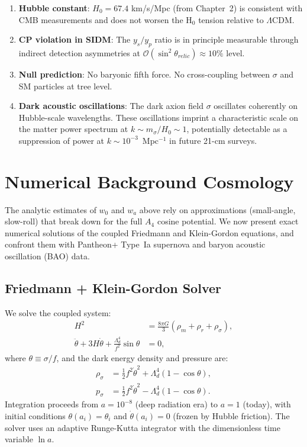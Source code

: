 \begin{enumerate}
  \item \textbf{Hubble constant}: $H_0 = 67.4$ km/s/Mpc (from Chapter~2)
        is consistent with CMB measurements and does not worsen the H$_0$ tension
        relative to $\Lambda$CDM.

  \item \textbf{CP violation in SIDM}: The $y_s/y_p$ ratio is in principle
        measurable through indirect detection asymmetries at
        $\mathcal{O}(\sin^2\theta_{relic}) \approx 10\%$ level.

  \item \textbf{Null prediction}: No baryonic fifth force.
        No cross-coupling between $\sigma$ and SM particles at tree level.

  \item \textbf{Dark acoustic oscillations}: The dark axion field $\sigma$
        oscillates coherently on Hubble-scale wavelengths. These oscillations
        imprint a characteristic scale on the matter power spectrum at
        $k \sim m_\sigma/H_0 \sim 1$, potentially detectable as a suppression
        of power at $k \sim 10^{-3}$~Mpc$^{-1}$ in future 21-cm surveys.
\end{enumerate}

\section{Numerical Background Cosmology}
\label{ch3:numerical_cosmology}

The analytic estimates of $w_0$ and $w_a$ above rely on approximations
(small-angle, slow-roll) that break down for the full $A_4$ cosine potential.
We now present exact numerical solutions of the coupled Friedmann and
Klein-Gordon equations, and confront them with Pantheon+ Type~Ia supernova
and baryon acoustic oscillation (BAO) data.

\subsection{Friedmann + Klein-Gordon Solver}
\label{ch3:friedmann_kg}

We solve the coupled system:
\begin{align}
  H^2 &= \frac{8\pi G}{3}\left(\rho_m + \rho_r + \rho_\sigma\right), \\
  \ddot{\theta} + 3H\dot{\theta} + \frac{\Lambda_d^4}{f^2}\sin\theta &= 0,
\end{align}
where $\theta \equiv \sigma/f$, and the dark energy density and pressure are:
\begin{align}
  \rho_\sigma &= \tfrac{1}{2}f^2\dot{\theta}^2 + \Lambda_d^4(1 - \cos\theta), \\
  p_\sigma &= \tfrac{1}{2}f^2\dot{\theta}^2 - \Lambda_d^4(1 - \cos\theta).
\end{align}
Integration proceeds from $a = 10^{-8}$ (deep radiation era) to $a = 1$ (today),
with initial conditions $\theta(a_i) = \theta_i$ and $\dot{\theta}(a_i) = 0$
(frozen by Hubble friction). The solver uses an adaptive Runge-Kutta integrator
with the dimensionless time variable $\ln a$.

